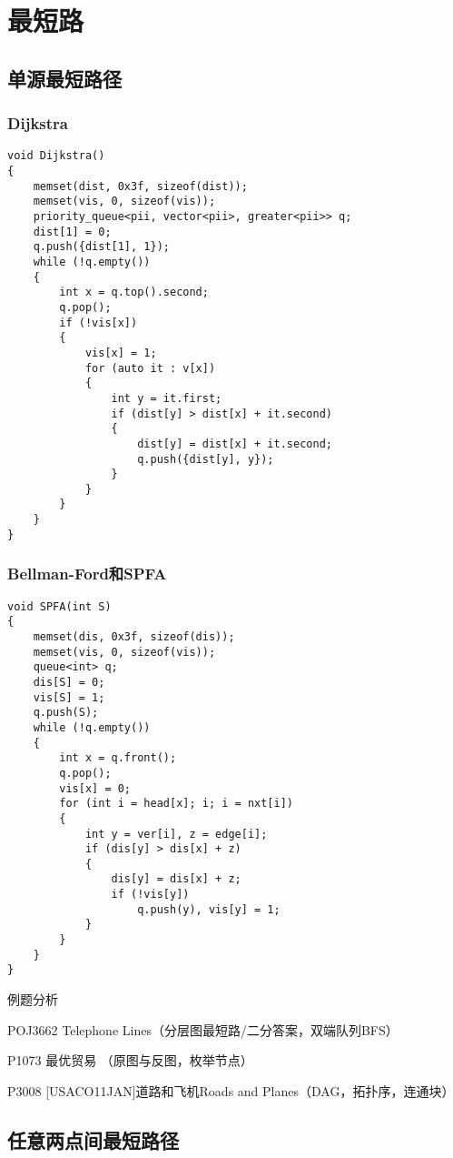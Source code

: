 \section{最短路}
\subsection{单源最短路径}
\subsubsection{Dijkstra}
\begin{lstlisting}
void Dijkstra()
{
    memset(dist, 0x3f, sizeof(dist));
    memset(vis, 0, sizeof(vis));
    priority_queue<pii, vector<pii>, greater<pii>> q;
    dist[1] = 0;
    q.push({dist[1], 1});
    while (!q.empty())
    {
        int x = q.top().second;
        q.pop();
        if (!vis[x])
        {
            vis[x] = 1;
            for (auto it : v[x])
            {
                int y = it.first;
                if (dist[y] > dist[x] + it.second)
                {
                    dist[y] = dist[x] + it.second;
                    q.push({dist[y], y});
                }
            }
        }
    }
}
\end{lstlisting}
\subsubsection{Bellman-Ford和SPFA}
\begin{lstlisting}
void SPFA(int S)
{
    memset(dis, 0x3f, sizeof(dis));
    memset(vis, 0, sizeof(vis));
    queue<int> q;
    dis[S] = 0;
    vis[S] = 1;
    q.push(S);
    while (!q.empty())
    {
        int x = q.front();
        q.pop();
        vis[x] = 0;
        for (int i = head[x]; i; i = nxt[i])
        {
            int y = ver[i], z = edge[i];
            if (dis[y] > dis[x] + z)
            {
                dis[y] = dis[x] + z;
                if (!vis[y])
                    q.push(y), vis[y] = 1;
            }
        }
    }
}
\end{lstlisting}
例题分析

POJ3662 Telephone Lines（分层图最短路/二分答案，双端队列BFS）

P1073 最优贸易 （原图与反图，枚举节点）

P3008 [USACO11JAN]道路和飞机Roads and Planes（DAG，拓扑序，连通块）

\subsection{任意两点间最短路径}
